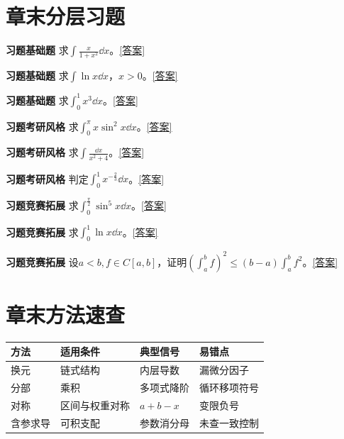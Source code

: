\section*{章末分层习题}
\label{q:3:1}\par\noindent\textbf{习题\theexercise\quad 基础题} 求$\int \frac{x}{1+x^2}\dd x$。\quad\hyperref[a:3:1]{[答案]}\par
{}\label{q:3:2}\par\noindent\textbf{习题\theexercise\quad 基础题} 求$\int\ln x\dd x$，$x>0$。\quad\hyperref[a:3:2]{[答案]}\par
{}\label{q:3:3}\par\noindent\textbf{习题\theexercise\quad 基础题} 求$\int_0^1x^3\dd x$。\quad\hyperref[a:3:3]{[答案]}\par
{}\label{q:3:4}\par\noindent\textbf{习题\theexercise\quad 考研风格} 求$\int_0^\pi x\sin^2x\dd x$。\quad\hyperref[a:3:4]{[答案]}\par
{}\label{q:3:5}\par\noindent\textbf{习题\theexercise\quad 考研风格} 求$\int\frac{\dd x}{x^2+4}$。\quad\hyperref[a:3:5]{[答案]}\par
{}\label{q:3:6}\par\noindent\textbf{习题\theexercise\quad 考研风格} 判定$\int_0^1x^{-\frac{2}{3}}\dd x$。\quad\hyperref[a:3:6]{[答案]}\par
{}\label{q:3:7}\par\noindent\textbf{习题\theexercise\quad 竞赛拓展} 求$\int_0^{\frac{\pi}{2}}\sin^5x\dd x$。\quad\hyperref[a:3:7]{[答案]}\par
{}\label{q:3:8}\par\noindent\textbf{习题\theexercise\quad 竞赛拓展} 求$\int_0^1\ln x\dd x$。\quad\hyperref[a:3:8]{[答案]}\par
{}\label{q:3:9}\par\noindent\textbf{习题\theexercise\quad 竞赛拓展} 设$a<b,f\in C[a,b]$，证明$(\int_a^bf)^2\le(b-a)\int_a^bf^2$。\quad\hyperref[a:3:9]{[答案]}\par
\section*{章末方法速查}
\par\noindent\begin{tabularx}{\textwidth}{p{23mm}XXX}\toprule 方法&适用条件&典型信号&易错点\\\midrule
换元&链式结构&内层导数&漏微分因子\\分部&乘积&多项式降阶&循环移项符号\\对称&区间与权重对称&$a+b-x$&变限负号\\含参求导&可积支配&参数消分母&未查一致控制\\
\bottomrule\end{tabularx}
